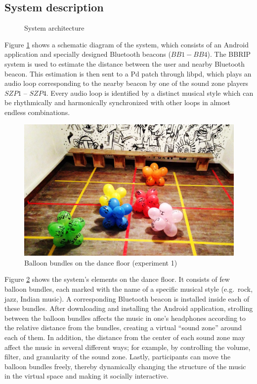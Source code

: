 \documentclass[a4paper,11pt]{article}
\begin{document}
\subsection{System description}\label{systemdescription}

\begin{figure}[!htb]
	\centering
	\def\svgwidth{0.9\textwidth}
	
	\caption{System architecture}\label{fig:sys:architecture}
\end{figure}

Figure \ref{fig:sys:architecture} shows a schematic diagram of the system, which consists of an Android application and specially designed Bluetooth beacons ($BB1 - BB4$).
The BBRIP system is used to estimate the distance between the user and nearby Bluetooth beacon.
This estimation is then sent to a Pd patch through libpd, which plays an audio loop corresponding to the nearby beacon by one of the sound zone players $SZP1$ -- $SZP4$.
Every audio loop is identified by a distinct musical style which can be rhythmically and harmonically synchronized with other loops in almost endless combinations.

\begin{figure}[!htb]
	\includegraphics[width=\linewidth]{balloons}
        \caption{Balloon bundles on the dance floor (experiment 1)}\label{fig:balloons}
\end{figure}

Figure \ref{fig:balloons} shows the system's elements on the dance floor.
It consists of few balloon bundles, each marked with the name of a specific musical style (e.g.\ rock, jazz, Indian music).
A corresponding Bluetooth beacon is installed inside each of these bundles.
After downloading and installing the Android application, strolling between the balloon bundles affects the music in one's headphones according to the relative distance from the bundles, creating a virtual ``sound zone'' around each of them.
In addition, the distance from the center of each sound zone may affect the music in several different ways; for example, by controlling the volume, filter, and granularity of the sound zone.
Lastly, participants can move the balloon bundles freely, thereby dynamically changing the structure of the music in the virtual space and making it socially interactive.
\end{document}
